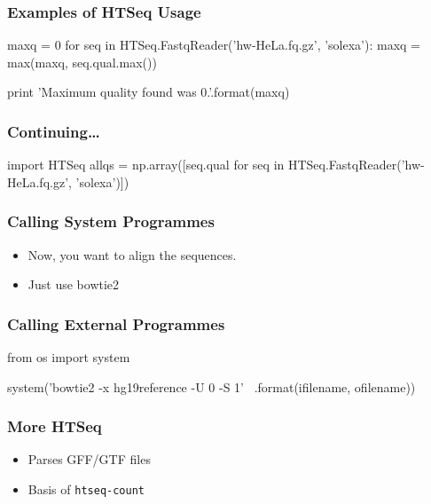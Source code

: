 \begin{frame}[fragile]
\frametitle{Examples of HTSeq Usage}

\begin{python}
maxq = 0
for seq in HTSeq.FastqReader('hw-HeLa.fq.gz', 'solexa'):
    maxq = max(maxq, seq.qual.max())

print 'Maximum quality found was {0}.'.format(maxq)
\end{python}

\end{frame}

\begin{frame}[fragile]
\frametitle{Continuing\ldots}

\begin{python}
import HTSeq
allqs = np.array([seq.qual
            for seq in
                HTSeq.FastqReader('hw-HeLa.fq.gz', 'solexa')])
\end{python}

\end{frame}

\begin{frame}[fragile]
\frametitle{Calling System Programmes}

\begin{itemize}
\item Now, you want to align the sequences.
\item Just use \alert{bowtie2}
\end{itemize}


\end{frame}

\begin{frame}[fragile]
\frametitle{Calling External Programmes}

\begin{python}
from os import system

system('bowtie2 -x hg19reference -U {0} -S {1}' \
                .format(ifilename, ofilename))

\end{python}
\end{frame}

\begin{frame}[fragile]
\frametitle{More HTSeq}
\begin{itemize}
\item Parses GFF/GTF files
\item Basis of \texttt{htseq-count}
\end{itemize}
\end{frame}


